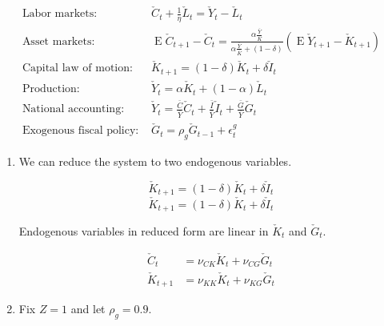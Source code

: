 \documentclass[11pt]{article}
\DeclareMathOperator{\ev}{E}
\begin{document}
        \begin{align*}
            \text{Labor markets:~} & \check{C}_t + \frac{1}{\eta} \check{L}_t = \check{Y}_t - \check{L}_t \\
            \text{Asset markets:~} & \ev \check{C}_{t+1} - \check{C}_t = \frac{\alpha \frac{\bar{Y}}{\bar{K}}}{\alpha \frac{\bar{Y}}{\bar{K}} + (1-\delta)} (\ev \check{Y}_{t+1} - \check{K}_{t+1} ) \\
            \text{Capital law of motion:~} & \check{K}_{t+1} = (1-\delta) \check{K}_t + \delta \check{I}_t \\
            \text{Production:~} & \check{Y}_t = \alpha \check{K}_t + (1-\alpha) \check{L}_t \\
            \text{National accounting:~} & \check{Y}_t = \frac{\bar{C}}{\bar{Y}} \check{C}_t + \frac{\bar{I}}{\bar{Y}} \check{I}_t + \frac{\bar{G}}{\bar{Y}} \check{G}_t \\
            \text{Exogenous fiscal policy:~} & \check{G}_t = \rho_g \check{G}_{t-1} + \epsilon_t^g
        \end{align*}


    \begin{enumerate}

        \item We can reduce the system to two endogenous variables.

            $$ \check{K}_{t+1} = (1-\delta) \check{K}_t + \delta \check{I}_t $$
            $$ \check{K}_{t+1} = (1-\delta) \check{K}_t + \delta \check{I}_t $$

        Endogenous variables in reduced form are linear in $\check K_t$ and $\check G_t$.

            \begin{align*}
                \check C_t & = \nu_{CK} \check K_t + \nu_{CG} \check G_t \\
                \check K_{t+1} & = \nu_{KK} \check K_t + \nu_{KG} \check G_t
            \end{align*}

        \item Fix $Z=1$ and let $\rho_g = 0.9$.

    \end{enumerate}
\end{document}
